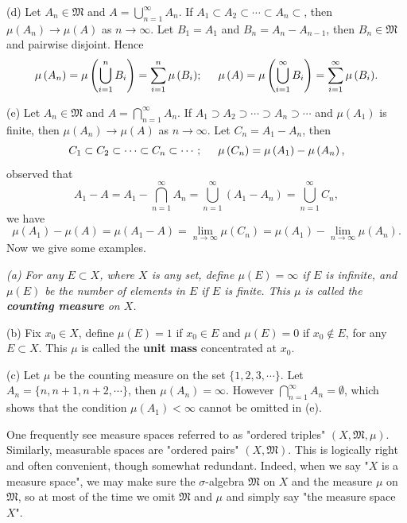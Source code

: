 (d) Let $A_n\in\mathfrak{M}$ and $A=\bigcup_{n=1}^\infty A_n$. If $A_1\subset A_2\subset\cdots\subset A_n\subset$, then $\mu(A_n)\to\mu(A)$ as $n\to\infty$. Let $B_1=A_1$ and $B_n=A_n-A_{n-1}$, then $B_n\in\mathfrak{M}$ and pairwise disjoint. Hence 
$$
\mu \left( A_n \right) =\mu \left( \bigcup_{i=1}^n{B_i} \right) =\sum_{i=1}^n{\mu \left( B_i \right)};\hspace{0.5cm}\mu \left( A \right) =\mu \left( \bigcup_{i=1}^{\infty}{B_i} \right) =\sum_{i=1}^{\infty}{\mu \left( B_i \right)}.
$$\par
(e) Let $A_n\in\mathfrak{M}$ and $A=\bigcap_{n=1}^\infty A_n$. If $A_1\supset A_2\supset\cdots\supset A_n\supset\cdots$ and $\mu(A_1)$ is finite, then $\mu(A_n)\to\mu(A)$ as $n\to\infty$. Let $C_n=A_1-A_n$, then 
$$
C_1\subset C_2\subset \cdots \subset C_n\subset \cdots ;\hspace{0.5cm}\mu \left( C_n \right) =\mu \left( A_1 \right) -\mu \left( A_n \right) ,
$$
observed that 
$$
A_1-A=A_1-\bigcap_{n=1}^{\infty}{A_n}=\bigcup_{n=1}^{\infty}{\left( A_1-A_n \right)}=\bigcup_{n=1}^{\infty}{C_n},
$$
we have 
$$
\mu \left( A_1 \right) -\mu \left( A \right) =\mu \left( A_1-A \right) =\lim_{n\rightarrow \infty} \mu \left( C_n \right) =\mu \left( A_1 \right) -\lim_{n\rightarrow \infty} \mu \left( A_n \right) .
$$
Now we give some examples.
\begin{example}\em
(a) For any $E\subset X$, where $X$ is any set, define $\mu(E)=\infty$ if $E$ is infinite, and $\mu(E)$ be the number of elements in $E$ if $E$ is finite. This $\mu$ is called the \textbf{counting measure} on $X$.\par
(b) Fix $x_0\in X$, define $\mu(E)=1$ if $x_0\in E$ and $\mu(E)=0$ if $x_0\notin E$, for any $E\subset X$. This $\mu$ is called the \textbf{unit mass} concentrated at $x_0$.\par
(c) Let $\mu$ be the counting measure on the set $\{1,2,3,\cdots\}$. Let $A_n=\{n,n+1,n+2,\cdots\}$, then $\mu(A_n)=\infty$. However $\bigcap_{n=1}^\infty A_n=\emptyset$, which shows that the condition $\mu(A_1)<\infty$ cannot be omitted in (e).
\end{example}
One frequently see measure spaces referred to as "ordered triples" $(X,\mathfrak{M},\mu)$. Similarly, measurable spaces are "ordered pairs" $(X,\mathfrak{M})$. This is logically right and often convenient, though somewhat redundant. Indeed, when we say "$X$ is a measure space", we may make sure the $\sigma$-algebra $\mathfrak{M}$ on $X$ and the measure $\mu$ on $\mathfrak{M}$, so at most of the time we omit $\mathfrak{M}$ and $\mu$ and simply say "the measure space $X$".\par
